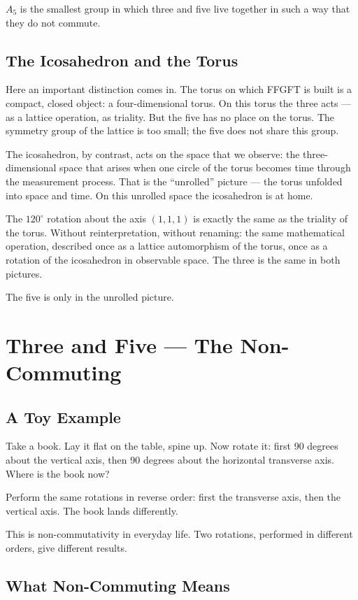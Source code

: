 \documentclass[12pt,oneside]{book}
\begin{document}
$A_5$ is the smallest group in which three and five live together in such a way that they do not commute.

\section{The Icosahedron and the Torus}

Here an important distinction comes in. The torus on which FFGFT is built is a compact, closed object: a four-dimen\-sional torus. On this torus the three acts --- as a lattice operation, as triality. But the five has no place on the torus. The symmetry group of the lattice is too small; the five does not share this group.

The icosa\-hedron, by contrast, acts on the space that we observe: the three-dimensional space that arises when one circle of the torus becomes time through the measurement process. That is the ``unrolled'' picture --- the torus unfolded into space and time. On this unrolled space the icosa\-hedron is at home.

The $120^\circ$ rotation about the axis $(1, 1, 1)$ is exactly the same as the triality of the torus. Without reinterpretation, without renaming: the same mathematical operation, described once as a lattice automorphism of the torus, once as a rotation of the icosa\-hedron in observable space. The three is the same in both pictures.

The five is only in the unrolled picture.

\chapter{Three and Five --- The Non-Commuting}

\section{A Toy Example}

Take a book. Lay it flat on the table, spine up. Now rotate it: first 90 degrees about the vertical axis, then 90 degrees about the horizontal transverse axis. Where is the book now?

Perform the same rotations in reverse order: first the transverse axis, then the vertical axis. The book lands differently.

This is non-commu\-tativity in everyday life. Two rotations, performed in different orders, give different results.

\section{What Non-Commuting Means}
\end{document}
